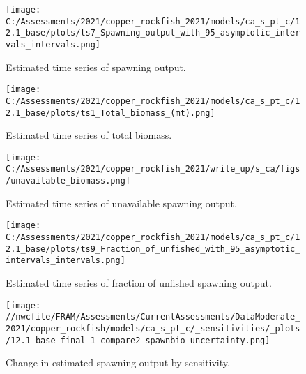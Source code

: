 \documentclass[11pt,
  english,
  a4paper,
]{article}
\begin{document}
\begin{figure}
\centering
\texttt{[image: C:/Assessments/2021/copper\_rockfish\_2021/models/ca\_s\_pt\_c/12.1\_base/plots/ts7\_Spawning\_output\_with\_95\_asymptotic\_intervals\_intervals.png]}
\caption{Estimated time series of spawning output.\label{fig:ssb}}
\end{figure}

\tagmcend\tagstructend


\begin{figure}
\centering
\texttt{[image: C:/Assessments/2021/copper\_rockfish\_2021/models/ca\_s\_pt\_c/12.1\_base/plots/ts1\_Total\_biomass\_(mt).png]}
\caption{Estimated time series of total biomass.\label{fig:tot-bio}}
\end{figure}

\tagmcend\tagstructend


\begin{figure}
\centering
\texttt{[image: C:/Assessments/2021/copper\_rockfish\_2021/write\_up/s\_ca/figs/unavailable\_biomass.png]}
\caption{Estimated time series of unavailable spawning output.\label{fig:ssb-unavailable}}
\end{figure}

\tagmcend\tagstructend


\begin{figure}
\centering
\texttt{[image: C:/Assessments/2021/copper\_rockfish\_2021/models/ca\_s\_pt\_c/12.1\_base/plots/ts9\_Fraction\_of\_unfished\_with\_95\_asymptotic\_intervals\_intervals.png]}
\caption{Estimated time series of fraction of unfished spawning output.\label{fig:depl}}
\end{figure}

\tagmcend\tagstructend


\begin{figure}
\centering
\texttt{[image: //nwcfile/FRAM/Assessments/CurrentAssessments/DataModerate\_2021/copper\_rockfish/models/ca\_s\_pt\_c/\_sensitivities/\_plots/12.1\_base\_final\_1\_compare2\_spawnbio\_uncertainty.png]}
\caption{Change in estimated spawning output by sensitivity.\label{fig:sens-ssb-1}}
\end{figure}
\end{document}
